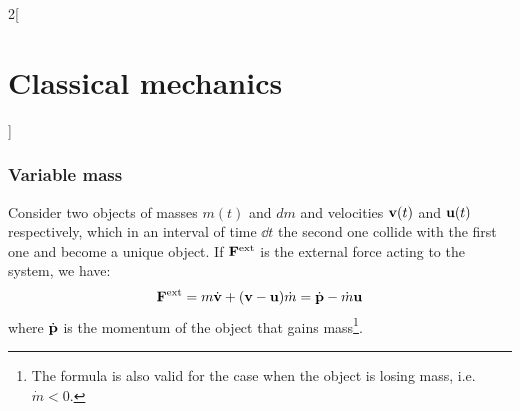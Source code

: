 \documentclass[../../../main.tex]{subfiles}
\begin{document}
\begin{multicols}{2}[\section{Classical mechanics}]
    \subsubsection*{Variable mass}
    \begin{prop}
        Consider two objects of masses $m(t)$ and $dm$ and velocities $\vb{v}(t)$ and $\vb{u}(t)$ respectively, which in an interval of time $\dd t$ the second one collide with the first one and become a unique object. If $\vb{F}^\text{ext}$ is the external force acting to the system, we have:
        \begin{equation}
            \vb{F}^\text{ext}=m\dot{\vb{v}}+(\vb{v}-\vb{u})\dot{m}=\dot{\vb{p}}-\dot{m}\vb{u}
            \label{mass}
        \end{equation}
        where $\dot{\vb{p}}$ is the momentum of the object that gains mass\footnote{The formula is also valid for the case when the object is losing mass, i.e. $\dot{m}<0$.}.
    \end{prop}

\end{multicols}
\end{document}
